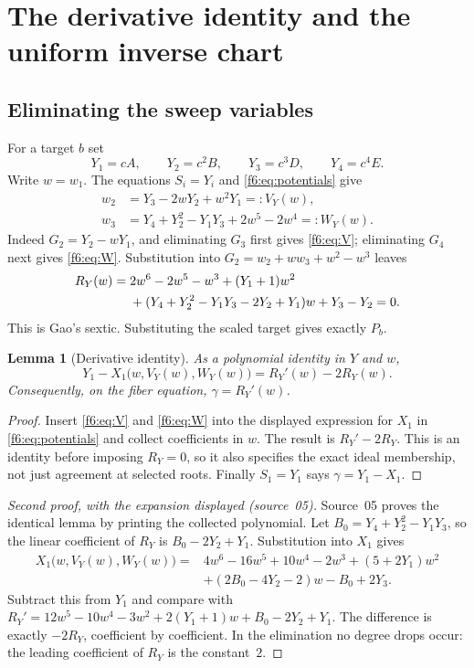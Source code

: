 \documentclass[11pt,a4paper]{article}
\newtheorem{lemma}[theorem]{Lemma}
\theoremstyle{definition}
\newcommand{\src}[1]{\textup{(source~#1)}}
\begin{document}
\section{The derivative identity and the uniform inverse chart}
\label{f6:sec:chart}

\subsection{Eliminating the sweep variables}
For a target $b$ set
\[
 Y_1=cA,\qquad Y_2=c^2B,\qquad Y_3=c^3D,\qquad Y_4=c^4E.
\]
Write $w=w_1$. The equations $S_i=Y_i$ and
\eqref{f6:eq:potentials} give
\begin{align}
 w_2&=Y_3-2wY_2+w^2Y_1=:V_Y(w),\label{f6:eq:V}\\
 w_3&=Y_4+Y_2^2-Y_1Y_3+2w^5-2w^4=:W_Y(w).\label{f6:eq:W}
\end{align}
Indeed $G_2=Y_2-wY_1$, and eliminating $G_3$ first gives
\eqref{f6:eq:V}; eliminating $G_4$ next gives \eqref{f6:eq:W}.
Substitution into $G_2=w_2+ww_3+w^2-w^3$ leaves
\begin{align}
 R_Y(w)={}&2w^6-2w^5-w^3+(Y_1+1)w^2\notag\\
 &+(Y_4+Y_2^2-Y_1Y_3-2Y_2+Y_1)w+Y_3-Y_2=0.
 \label{f6:eq:RY}
\end{align}
This is Gao's sextic. Substituting the scaled target gives exactly $P_b$.

\begin{lemma}[Derivative identity]\label{f6:lem:derivative}
As a polynomial identity in $Y$ and $w$,
\begin{equation}\label{f6:eq:derivative}
 Y_1-X_1\bigl(w,V_Y(w),W_Y(w)\bigr)=R_Y'(w)-2R_Y(w).
\end{equation}
Consequently, on the fiber equation, $\gamma=R_Y'(w)$.
\end{lemma}
\begin{proof}
Insert \eqref{f6:eq:V} and \eqref{f6:eq:W} into the displayed expression for
$X_1$ in \eqref{f6:eq:potentials} and collect coefficients in $w$. The result
is $R_Y'-2R_Y$. This is an identity before imposing $R_Y=0$, so it
also specifies the exact ideal membership, not just agreement at selected
roots. Finally $S_1=Y_1$ says $\gamma=Y_1-X_1$.
\end{proof}

\begin{proof}[Second proof, with the expansion displayed \src{05}]
Source~05 proves the identical lemma by printing the collected polynomial.
Let $B_0=Y_4+Y_2^2-Y_1Y_3$, so the linear coefficient of $R_Y$ is
$B_0-2Y_2+Y_1$. Substitution into $X_1$ gives
\begin{align*}
X_1\bigl(w,V_Y(w),W_Y(w)\bigr)={}&4w^6-16w^5+10w^4-2w^3+(5+2Y_1)w^2\\
&+(2B_0-4Y_2-2)w-B_0+2Y_3.
\end{align*}
Subtract this from $Y_1$ and compare with
$R_Y'=12w^5-10w^4-3w^2+2(Y_1+1)w+B_0-2Y_2+Y_1$. The difference is exactly
$-2R_Y$, coefficient by coefficient. In the elimination no degree drops
occur: the leading coefficient of $R_Y$ is the constant~$2$.
\end{proof}
\end{document}
